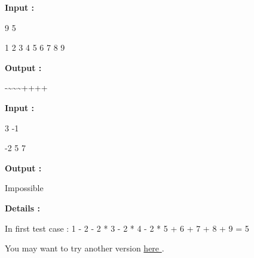 \textbf{Input : }


9 5

1 2 3 4 5 6 7 8 9

\textbf{Output : }


-\textasciitilde\textasciitilde\textasciitilde++++




\textbf{Input : }


3 -1

-2 5 7


\textbf{Output : }


Impossible




\textbf{Details : }


In first test case : 1 - 2 - 2 * 3 - 2 * 4 - 2 * 5 + 6 + 7 + 8 + 9 = 5

You may want to try another version \href{/problems/show/BLOPER}{ here } .